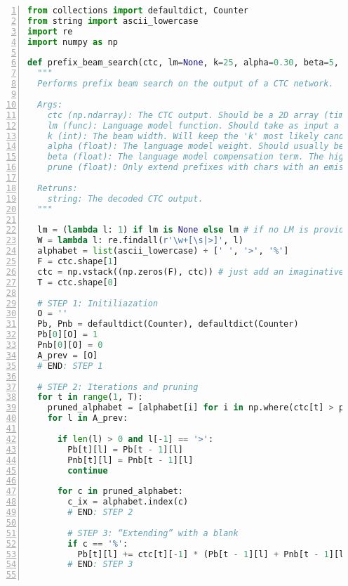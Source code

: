 \begin{lstlisting}[language = python, numbers=left, 
         numberstyle=\tiny,keywordstyle=\color{blue!70},
         commentstyle=\color{red!50!green!50!blue!50},frame=shadowbox,
         rulesepcolor=\color{red!20!green!20!blue!20},basicstyle=\ttfamily]
from collections import defaultdict, Counter
from string import ascii_lowercase
import re
import numpy as np

def prefix_beam_search(ctc, lm=None, k=25, alpha=0.30, beta=5, prune=0.001):
  """
  Performs prefix beam search on the output of a CTC network.

  Args:
    ctc (np.ndarray): The CTC output. Should be a 2D array (timesteps x alphabet_size)
    lm (func): Language model function. Should take as input a string and output a probability.
    k (int): The beam width. Will keep the 'k' most likely candidates at each timestep.
    alpha (float): The language model weight. Should usually be between 0 and 1.
    beta (float): The language model compensation term. The higher the 'alpha', the higher the 'beta'.
    prune (float): Only extend prefixes with chars with an emission probability higher than 'prune'.

  Retruns:
    string: The decoded CTC output.
  """

  lm = (lambda l: 1) if lm is None else lm # if no LM is provided, just set to function returning 1
  W = lambda l: re.findall(r'\w+[\s|>]', l)
  alphabet = list(ascii_lowercase) + [' ', '>', '%']
  F = ctc.shape[1]
  ctc = np.vstack((np.zeros(F), ctc)) # just add an imaginative zero'th step (will make indexing more intuitive)
  T = ctc.shape[0]

  # STEP 1: Initiliazation
  O = ''
  Pb, Pnb = defaultdict(Counter), defaultdict(Counter)
  Pb[0][O] = 1
  Pnb[0][O] = 0
  A_prev = [O]
  # END: STEP 1

  # STEP 2: Iterations and pruning
  for t in range(1, T):
    pruned_alphabet = [alphabet[i] for i in np.where(ctc[t] > prune)[0]]
    for l in A_prev:
      
      if len(l) > 0 and l[-1] == '>':
        Pb[t][l] = Pb[t - 1][l]
        Pnb[t][l] = Pnb[t - 1][l]
        continue  

      for c in pruned_alphabet:
        c_ix = alphabet.index(c)
        # END: STEP 2
        
        # STEP 3: “Extending” with a blank
        if c == '%':
          Pb[t][l] += ctc[t][-1] * (Pb[t - 1][l] + Pnb[t - 1][l])
        # END: STEP 3
        

\end{lstlisting}
